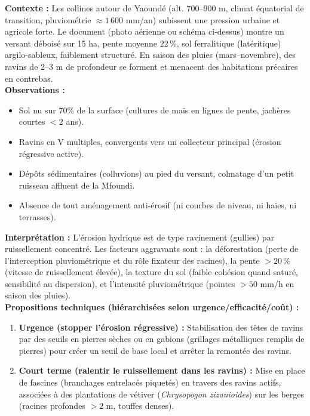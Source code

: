 \documentclass[11pt]{article}
\newcommand{\cle}[1]{{\popxbold\color{popdark}#1}}
\begin{document}
\begin{experience}
\textbf{Contexte :} Les collines autour de Yaoundé (alt. 700–900 m, climat équatorial de transition, pluviométrie $\approx 1\,600$ mm/an) subissent une pression urbaine et agricole forte. Le document (photo aérienne ou schéma ci-dessus) montre un versant déboisé sur 15 ha, pente moyenne $22\,\%$, sol ferralitique (latéritique) argilo-sableux, faiblement structuré. En saison des pluies (mars–novembre), des ravins de 2–3 m de profondeur se forment et menacent des habitations précaires en contrebas.\\
\textbf{Observations :} 
\begin{itemize}
\item Sol nu sur 70\% de la surface (cultures de maïs en lignes de pente, jachères courtes $< 2$ ans).
\item Ravins en V multiples, convergents vers un collecteur principal (érosion régressive active).
\item Dépôts sédimentaires (colluvions) au pied du versant, colmatage d'un petit ruisseau affluent de la Mfoundi.
\item Absence de tout aménagement anti-érosif (ni courbes de niveau, ni haies, ni terrasses).
\end{itemize}
\textbf{Interprétation :} L'érosion hydrique est de type \cle{ravinement} (gullies) par ruissellement concentré. Les facteurs aggravants sont : la déforestation (perte de l'interception pluviométrique et du rôle fixateur des racines), la pente $> 20\,\%$ (vitesse de ruissellement élevée), la texture du sol (faible cohésion quand saturé, sensibilité au dispersion), et l'intensité pluviométrique (pointes $> 50$ mm/h en saison des pluies).\\
\textbf{Propositions techniques (hiérarchisées selon urgence/efficacité/coût) :}
\begin{enumerate}
\item \textbf{Urgence (stopper l'érosion régressive) :} Stabilisation des têtes de ravins par des seuils en pierres sèches ou en gabions (grillages métalliques remplis de pierres) pour créer un seuil de base local et arrêter la remontée des ravins.
\item \textbf{Court terme (ralentir le ruissellement dans les ravins) :} Mise en place de fascines (branchages entrelacés piquetés) en travers des ravins actifs, associées à des plantations de vétiver (\emph{Chrysopogon zizanioides}) sur les berges (racines profondes $> 2$ m, touffes denses).

\end{enumerate}
\end{experience}
\end{document}
